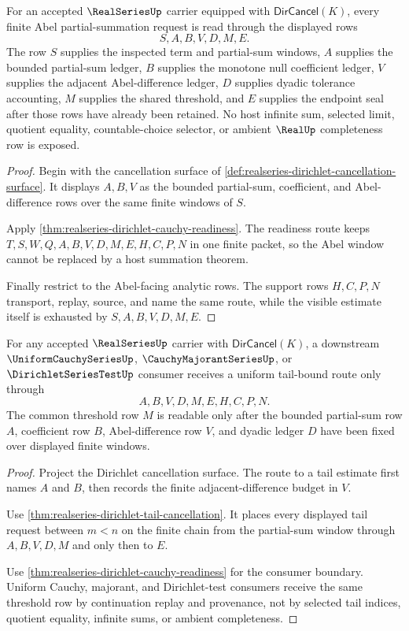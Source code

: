 \begin{theorem}
\label{thm:realseries-abel-partial-summation-window}
For an accepted $\RealSeriesUp$ carrier equipped with $\mathsf{DirCancel}(K)$, every finite Abel partial-summation request is read through the displayed rows
$$
S,A,B,V,D,M,E .
$$
The row $S$ supplies the inspected term and partial-sum windows, $A$ supplies the bounded partial-sum ledger, $B$ supplies the monotone null coefficient ledger, $V$ supplies the adjacent Abel-difference ledger, $D$ supplies dyadic tolerance accounting, $M$ supplies the shared threshold, and $E$ supplies the endpoint seal after those rows have already been retained. No host infinite sum, selected limit, quotient equality, countable-choice selector, or ambient $\RealUp$ completeness row is exposed.
\end{theorem}
\begin{proof}
Begin with the cancellation surface of \autoref{def:realseries-dirichlet-cancellation-surface}. It displays $A,B,V$ as the bounded partial-sum, coefficient, and Abel-difference rows over the same finite windows of $S$.

Apply \autoref{thm:realseries-dirichlet-cauchy-readiness}. The readiness route keeps $T,S,W,Q,A,B,V,D,M,E,H,C,P,N$ in one finite packet, so the Abel window cannot be replaced by a host summation theorem.

Finally restrict to the Abel-facing analytic rows. The support rows $H,C,P,N$ transport, replay, source, and name the same route, while the visible estimate itself is exhausted by $S,A,B,V,D,M,E$.
\end{proof}

\begin{theorem}
\label{thm:realseries-dirichlet-uniform-tail-bound}
For any accepted $\RealSeriesUp$ carrier with $\mathsf{DirCancel}(K)$, a downstream $\UniformCauchySeriesUp$, $\CauchyMajorantSeriesUp$, or $\DirichletSeriesTestUp$ consumer receives a uniform tail-bound route only through
$$
A,B,V,D,M,E,H,C,P,N .
$$
The common threshold row $M$ is readable only after the bounded partial-sum row $A$, coefficient row $B$, Abel-difference row $V$, and dyadic ledger $D$ have been fixed over displayed finite windows.
\end{theorem}
\begin{proof}
Project the Dirichlet cancellation surface. The route to a tail estimate first names $A$ and $B$, then records the finite adjacent-difference budget in $V$.

Use \autoref{thm:realseries-dirichlet-tail-cancellation}. It places every displayed tail request between $m<n$ on the finite chain from the partial-sum window through $A,B,V,D,M$ and only then to $E$.

Use \autoref{thm:realseries-dirichlet-cauchy-readiness} for the consumer boundary. Uniform Cauchy, majorant, and Dirichlet-test consumers receive the same threshold row by continuation replay and provenance, not by selected tail indices, quotient equality, infinite sums, or ambient completeness.
\end{proof}

